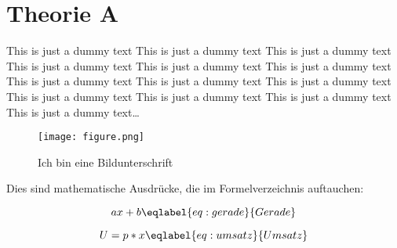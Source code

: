 \section{Theorie A}
\label{sec:theorieA}

This is just a dummy text This is just a dummy text This is just a dummy text This is just a dummy text This is just a dummy text This is just a dummy text This is just a dummy text This is just a dummy text This is just a dummy text This is just a dummy text This is just a dummy text This is just a dummy text This is just a dummy text\dots

\begin{figure}[H]
	\centering
	\texttt{[image: figure.png]}
	\caption{Ich bin eine Bildunterschrift}
	\label{fig:test}
\end{figure}

Dies sind mathematische Ausdrücke, die im Formelverzeichnis auftauchen:

\begin{equation}
ax + b
\eqlabel{eq:gerade}{Gerade}
\end{equation}

\begin{equation}
U = p * x
\eqlabel{eq:umsatz}{Umsatz}
\end{equation}
